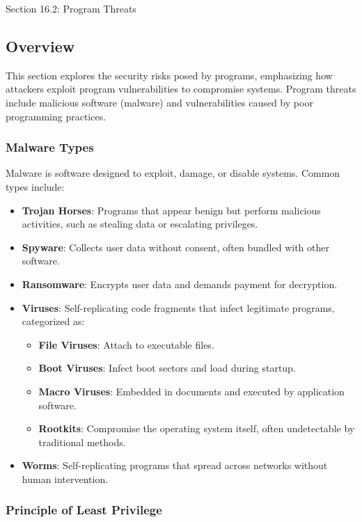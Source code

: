\begin{notes}{Section 16.2: Program Threats}
    \subsection*{Overview}

    This section explores the security risks posed by programs, emphasizing how attackers exploit program vulnerabilities to compromise systems. Program threats include malicious software (malware) and 
    vulnerabilities caused by poor programming practices.
    
    \subsubsection*{Malware Types}
    
    Malware is software designed to exploit, damage, or disable systems. Common types include:
    \begin{itemize}
        \item \textbf{Trojan Horses}: Programs that appear benign but perform malicious activities, such as stealing data or escalating privileges.
        \item \textbf{Spyware}: Collects user data without consent, often bundled with other software.
        \item \textbf{Ransomware}: Encrypts user data and demands payment for decryption.
        \item \textbf{Viruses}: Self-replicating code fragments that infect legitimate programs, categorized as:
        \begin{itemize}
            \item \textbf{File Viruses}: Attach to executable files.
            \item \textbf{Boot Viruses}: Infect boot sectors and load during startup.
            \item \textbf{Macro Viruses}: Embedded in documents and executed by application software.
            \item \textbf{Rootkits}: Compromise the operating system itself, often undetectable by traditional methods.
        \end{itemize}
        \item \textbf{Worms}: Self-replicating programs that spread across networks without human intervention.
    \end{itemize}
    
    \subsubsection*{Principle of Least Privilege}
    

\end{notes}
